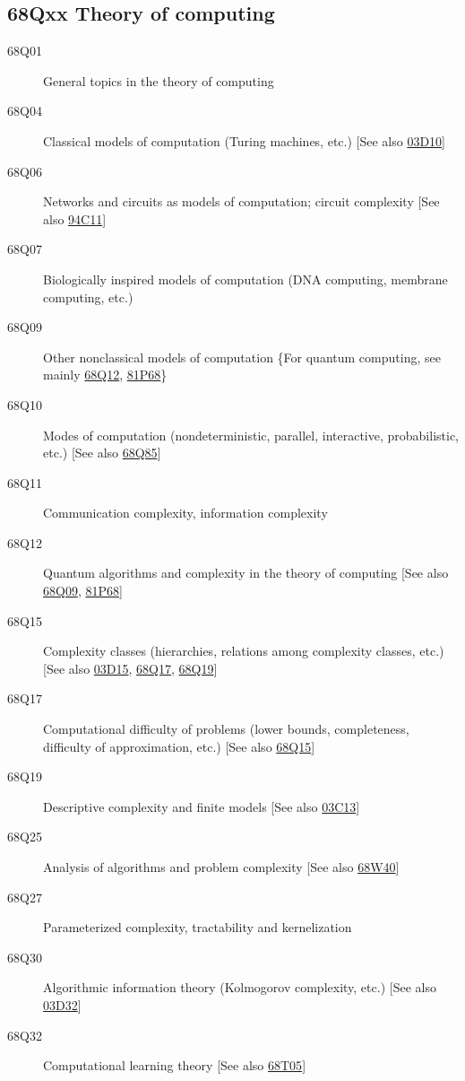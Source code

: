 \subsection*{68Qxx  Theory of computing }\label{68Qxx}
\begin{description}
\item [68Q01]\label{68Q01} General topics in the theory of computing
\item [68Q04]\label{68Q04} Classical models of computation (Turing machines, etc.) [See also \hyperref[03D10]{03D10}]
\item [68Q06]\label{68Q06} Networks and circuits as models of computation; circuit complexity [See also \hyperref[94C11]{94C11}]
\item [68Q07]\label{68Q07} Biologically inspired models of computation (DNA computing, membrane computing, etc.) 
\item [68Q09]\label{68Q09} Other nonclassical models of computation \{For quantum computing, see mainly \hyperref[68Q12]{68Q12}, \hyperref[81P68]{81P68}\}
\item [68Q10]\label{68Q10} Modes of computation (nondeterministic, parallel, interactive, probabilistic, etc.) [See also \hyperref[68Q85]{68Q85}]
\item [68Q11]\label{68Q11} Communication complexity, information complexity
\item [68Q12]\label{68Q12} Quantum algorithms and complexity in the theory of computing [See also \hyperref[68Q09]{68Q09}, \hyperref[81P68]{81P68}]
\item [68Q15]\label{68Q15} Complexity classes (hierarchies, relations among complexity classes, etc.) [See also \hyperref[03D15]{03D15}, \hyperref[68Q17]{68Q17}, \hyperref[68Q19]{68Q19}]
\item [68Q17]\label{68Q17} Computational difficulty of problems (lower bounds, completeness, difficulty of approximation, etc.) [See also \hyperref[68Q15]{68Q15}]
\item [68Q19]\label{68Q19} Descriptive complexity and finite models [See also \hyperref[03C13]{03C13}]
\item [68Q25]\label{68Q25} Analysis of algorithms and problem complexity [See also \hyperref[68W40]{68W40}]
\item [68Q27]\label{68Q27} Parameterized complexity, tractability and kernelization
\item [68Q30]\label{68Q30} Algorithmic information theory (Kolmogorov complexity, etc.) [See also \hyperref[03D32]{03D32}]
\item [68Q32]\label{68Q32} Computational learning theory [See also \hyperref[68T05]{68T05}]

\end{description}
